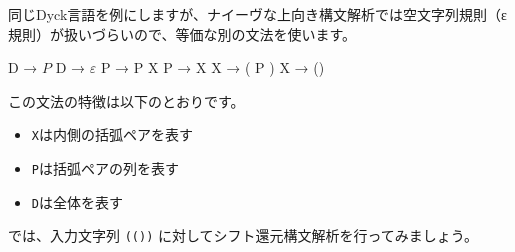 同じDyck言語を例にしますが、ナイーヴな上向き構文解析では空文字列規則（ε規則）が扱いづらいので、等価な別の文法を使います。

\begin{codescreen}{}
D → $ P $
D → $ ε $
P → P X
P → X
X → ( P )
X → ()
\end{codescreen}

この文法の特徴は以下のとおりです。

\begin{itemize}
\item
  \texttt{X}は内側の括弧ペアを表す
\item
  \texttt{P}は括弧ペアの列を表す
\item
  \texttt{D}は全体を表す
\end{itemize}

では、入力文字列 \texttt{(())}
に対してシフト還元構文解析を行ってみましょう。

